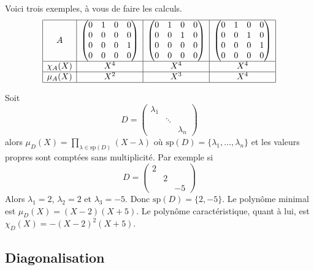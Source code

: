 \documentclass[12pt, class=report,crop=false]{standalone}
\newcommand{\Sp}{\text{sp}}
\begin{document}
\begin{exemple}
Voici trois exemples, à vous de faire les calculs.
\[
\begin{array}{|c|c|c|c|}
\hline
A & \begin{pmatrix}
0&1&0&0\\
0&0&0&0\\
0&0&0&1\\
0&0&0&0
\end{pmatrix}
 & 
\begin{pmatrix}
0&1&0&0\\
0&0&1&0\\
0&0&0&0\\
0&0&0&0
\end{pmatrix} & 
\begin{pmatrix}
0&1&0&0\\
0&0&1&0\\
0&0&0&1\\
0&0&0&0
\end{pmatrix}
\\\hline
\chi_A(X) & X^4 & X^4 & X^4\\\hline
\mu_A(X)&X^2&X^3& X^4\\\hline
\end{array}\]
\end{exemple}

\begin{exemple}
\label{ex:minidiag}
Soit 
\[
D = \begin{pmatrix}
\lambda_1& &\\
&\ddots&\\
&& \lambda_n
\end{pmatrix}
\]
alors $\mu_D(X) = \prod_{\lambda \in \Sp(D)}(X-\lambda)$ où $\Sp(D) = \{\lambda_1,\ldots,\lambda_n\}$ et les valeurs propres sont comptées sans multiplicité.
Par exemple si 
\[
D = \begin{pmatrix}
2& &\\
&2&\\
&&-5
\end{pmatrix}\]
Alors $\lambda_1= 2$, $\lambda_2 = 2$ et $\lambda_3 = -5$. Donc
$\Sp(D) = \{2,-5\}$. Le polynôme minimal est $\mu_D(X) = (X-2)(X+5)$. Le polynôme caractéristique,
 quant à lui, est $\chi_D(X) = -(X-2)^2(X+5)$.

\end{exemple}


\subsection{Diagonalisation}
\end{document}
